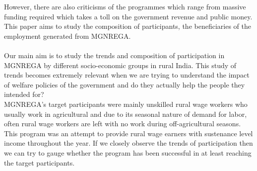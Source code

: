 \documentclass{article}
\begin{document}
However, there are also criticisms of the programmes which range from massive funding required which takes a toll on the government revenue and public money. This paper aims to study the composition of participants, the beneficiaries of the employment generated from MGNREGA.
\\
\\
Our main aim is to study the trends and composition of participation in MGNREGA by different socio-economic groups in rural India. This study of trends becomes extremely relevant when we are trying to understand the impact of welfare policies of the government and do they actually help the people they intended for? 
\\
MGNREGA's target participants were mainly unskilled rural wage workers who usually work in agricultural and due to its seasonal nature of demand for labor, often rural wage workers are left with no work during off-agricultural seasons. This program was an attempt to provide rural wage earners with sustenance level income throughout the year. If we closely observe the trends of participation then we can try to gauge whether the program has been successful in at least reaching the target participants.
\end{document}
